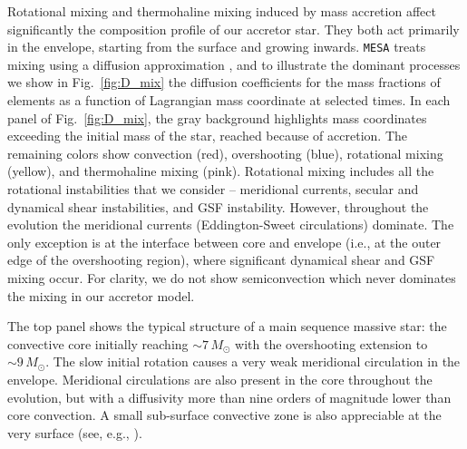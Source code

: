 \documentclass[twocolumn,twocolappendix,trackchanges]{aastex63}
\DeclareRobustCommand{\Figref}[1]{Fig.~\ref{#1}}
\newcommand{\zoph}{$\zeta$ Oph}
\begin{document}
Rotational mixing and thermohaline mixing induced by mass accretion
affect significantly the composition profile of our accretor star. They both
act primarily in the envelope, starting from the
surface and growing inwards. \texttt{MESA} treats mixing using a
diffusion approximation \citep{paxton:11}, and to illustrate the
dominant processes we show in
\Figref{fig:D_mix} the diffusion coefficients for the mass
fractions of elements as a function of Lagrangian mass coordinate at
selected times. %
In each panel of \Figref{fig:D_mix}, the gray background highlights
mass coordinates exceeding the initial mass of the star, reached
because of accretion.  The remaining colors show convection (red),
overshooting (blue), rotational mixing (yellow), and thermohaline
mixing (pink). Rotational mixing includes all the rotational
instabilities that we consider -- meridional currents, secular and
dynamical shear instabilities, and GSF instability. However,
throughout the evolution the meridional currents (Eddington-Sweet
circulations) dominate. The only exception is at the interface
between core and envelope (i.e., at the outer edge of the overshooting
region), where significant dynamical shear and
GSF mixing occur. For clarity, we do not show
semiconvection which never dominates the mixing in our accretor model.

The top panel shows the typical structure of a main sequence massive
star: the convective core initially reaching $\sim{}7\,M_\odot$ with
the overshooting extension to $\sim{}9\,M_\odot$. The slow initial
rotation causes a very weak meridional circulation in the envelope. Meridional
circulations are also present in the core throughout the evolution,
but with a diffusivity more than nine orders of magnitude lower than
core convection. A small sub-surface convective zone is also
appreciable at the very surface (see, e.g., \citealt{cantiello:21}).
\end{document}
